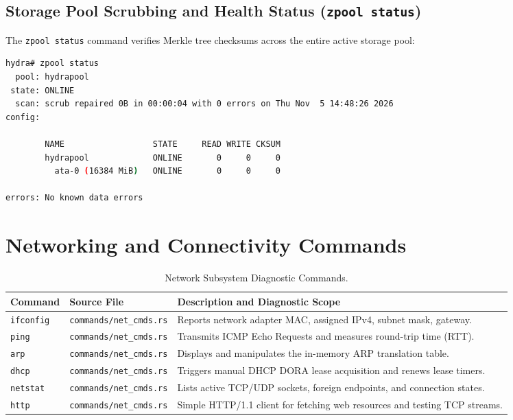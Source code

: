 \subsection{Storage Pool Scrubbing and Health Status (\texttt{zpool status})}
The \texttt{zpool status} command verifies Merkle tree checksums across the entire active storage pool:
\begin{lstlisting}[language=bash]
hydra# zpool status
  pool: hydrapool
 state: ONLINE
  scan: scrub repaired 0B in 00:00:04 with 0 errors on Thu Nov  5 14:48:26 2026
config:

        NAME                  STATE     READ WRITE CKSUM
        hydrapool             ONLINE       0     0     0
          ata-0 (16384 MiB)   ONLINE       0     0     0

errors: No known data errors
\end{lstlisting}

\section{Networking and Connectivity Commands}
\label{sec:shell_net_cmds}

\begin{table}[htbp]
\centering
\small
\begin{tabularx}{\textwidth}{llX}
\toprule
\textbf{Command} & \textbf{Source File} & \textbf{Description and Diagnostic Scope} \\
\midrule
\texttt{ifconfig} & \texttt{commands/net\_cmds.rs} & Reports network adapter MAC, assigned IPv4, subnet mask, gateway. \\
\texttt{ping} & \texttt{commands/net\_cmds.rs} & Transmits ICMP Echo Requests and measures round-trip time (RTT). \\
\texttt{arp} & \texttt{commands/net\_cmds.rs} & Displays and manipulates the in-memory ARP translation table. \\
\texttt{dhcp} & \texttt{commands/net\_cmds.rs} & Triggers manual DHCP DORA lease acquisition and renews lease timers. \\
\texttt{netstat} & \texttt{commands/net\_cmds.rs} & Lists active TCP/UDP sockets, foreign endpoints, and connection states. \\
\texttt{http} & \texttt{commands/net\_cmds.rs} & Simple HTTP/1.1 client for fetching web resources and testing TCP streams. \\
\bottomrule
\end{tabularx}
\caption{Network Subsystem Diagnostic Commands.}
\label{tab:shell_net_cmds}
\end{table}

